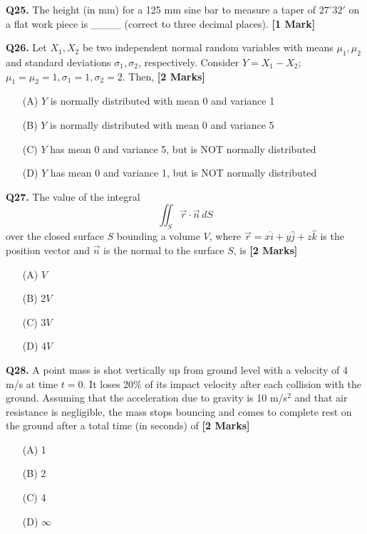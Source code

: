 \documentclass[11pt]{article}
\newcommand{\questiona}[2]{
    \noindent\textbf{Q#2.} #1 \hfill \textbf{[1 Mark]}
}
\newcommand{\questionb}[2]{
    \noindent\textbf{Q#2.} #1 \hfill \textbf{[2 Marks]}
}
\begin{document}
\questiona{The height (in mm) for a 125 mm sine bar to measure a taper of \( 27^\circ 32' \) on a flat work piece is \_\_\_\_ (correct to three decimal places).}{25}
\vspace{0.5cm}

\questionb{Let \( X_1, X_2 \) be two independent normal random variables with means \( \mu_1, \mu_2 \) and standard deviations \( \sigma_1, \sigma_2 \), respectively. Consider \( Y = X_1 - X_2 \); \( \mu_1 = \mu_2 = 1, \sigma_1 = 1, \sigma_2 = 2 \). Then,}{26}
\begin{enumerate}
    \item[(A)] \( Y \) is normally distributed with mean 0 and variance 1
    \item[(B)] \( Y \) is normally distributed with mean 0 and variance 5
    \item[(C)] \( Y \) has mean 0 and variance 5, but is NOT normally distributed
    \item[(D)] \( Y \) has mean 0 and variance 1, but is NOT normally distributed
\end{enumerate}
\vspace{0.5cm}

\questionb{The value of the integral
\[
\iint_S \vec{r} \cdot \vec{n} \, dS
\]
over the closed surface \( S \) bounding a volume \( V \), where \( \vec{r} = x\hat{i} + y\hat{j} + z\hat{k} \) is the position vector and \( \vec{n} \) is the normal to the surface \( S \), is}{27}
\begin{enumerate}
    \item[(A)] \( V \)
    \item[(B)] \( 2V \)
    \item[(C)] \( 3V \)
    \item[(D)] \( 4V \)
\end{enumerate}
\vspace{0.5cm}

\questionb{A point mass is shot vertically up from ground level with a velocity of 4 m/s at time \( t = 0 \). It loses 20\% of its impact velocity after each collision with the ground. Assuming that the acceleration due to gravity is 10 m/s\(^2\) and that air resistance is negligible, the mass stops bouncing and comes to complete rest on the ground after a total time (in seconds) of}{28}
\begin{enumerate}
    \item[(A)] 1
    \item[(B)] 2
    \item[(C)] 4
    \item[(D)] \( \infty \)
\end{enumerate}
\vspace{0.5cm}
\end{document}
